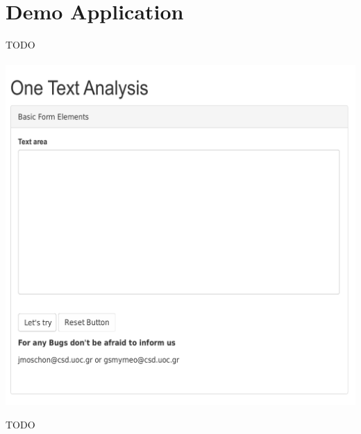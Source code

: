 
\chapter{Demo Application}
TODO\\
\\

\includegraphics[width=1\linewidth]{figure/screens/screen1_vector.pdf}

TODO\\
\\

